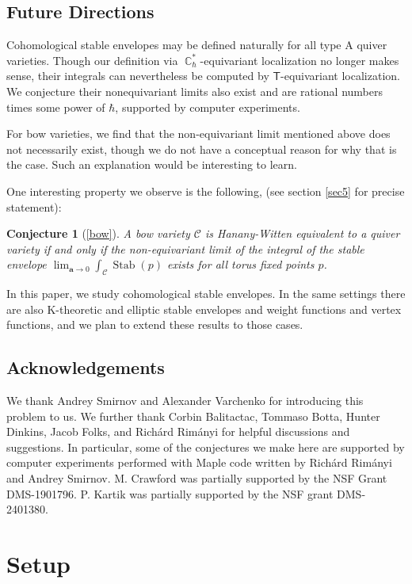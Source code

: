 \documentclass[12 pt]{article}
\theoremstyle{plain}
\theoremstyle{plain}
\theoremstyle{plain}
\theoremstyle{plain}
\theoremstyle{plain}
\theoremstyle{plain}
\theoremstyle{plain}
\theoremstyle{plain}
\theoremstyle{plain}
\theoremstyle{plain}
\newtheorem*{conjecture*}{Conjecture}
\theoremstyle{remark}
\theoremstyle{remark}
\theoremstyle{definition}
\theoremstyle{definition}
\theoremstyle{definition}
\theoremstyle{definition}
\theoremstyle{definition}
\theoremstyle{definition}
\DeclareMathOperator{\C}{\mathbb{C}}
\DeclareMathOperator{\Stab}{Stab}
\newcommand{\bT}{\mathsf{T}}
\begin{document}
\subsection{Future Directions}
Cohomological stable envelopes may be defined naturally for all type A quiver varieties. Though our definition via $\C^*_\hbar$-equivariant localization no longer makes sense, their integrals can nevertheless be computed by $\bT$-equivariant localization. We conjecture their nonequivariant limits also exist and are rational numbers times some power of $\hbar$, supported by computer experiments.

For bow varieties, we find that the non-equivariant limit mentioned above does not necessarily exist, though we do not have a conceptual reason for why that is the case. Such an explanation would be interesting to learn. 

One interesting property we observe is the following, (see section \ref{sec5} for precise statement):

\begin{conjecture*}[\ref{bow}]
A bow variety $\mathcal{C}$ is Hanany-Witten equivalent to a quiver variety
if and only if the non-equivariant limit of the integral of the stable envelope $\displaystyle \lim_{\textbf{a}\to 0}\int_{\mathcal{C}}\Stab(p)$ exists for all torus fixed points $p$. 
\end{conjecture*}

In this paper, we study cohomological stable envelopes. In the same settings there are also K-theoretic and elliptic stable envelopes and weight functions and vertex functions, and we plan to extend these results to those cases.

\subsection{Acknowledgements}
We thank Andrey Smirnov and Alexander Varchenko for introducing this problem to us. We further thank Corbin Balitactac, Tommaso Botta, Hunter Dinkins, Jacob Folks, and Rich\'ard Rim\'anyi for helpful discussions and suggestions. In particular, some of the conjectures we make here are supported by computer experiments performed with Maple code written by Rich\'ard Rim\'anyi and Andrey Smirnov. M. Crawford was partially supported by the NSF Grant DMS-1901796. P. Kartik was partially supported by the NSF grant DMS-2401380.

\section{Setup}
\end{document}
